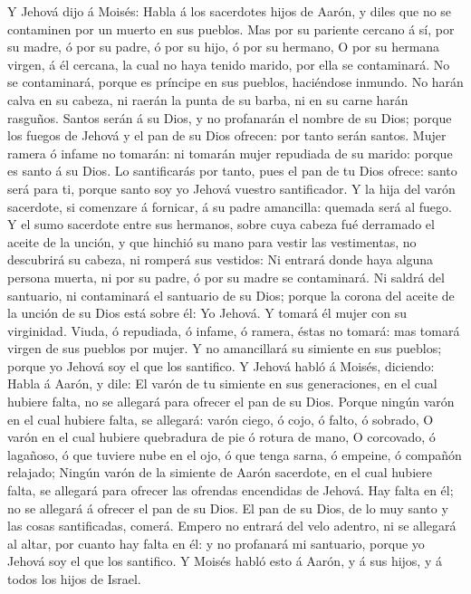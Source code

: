  Y Jehová dijo á Moisés: Habla á los sacerdotes hijos de
Aarón, y diles que no se contaminen por un muerto en sus pueblos.
 Mas por su pariente cercano á sí, por su madre, ó por su
padre, ó por su hijo, ó por su hermano,  O por su hermana
virgen, á él cercana, la cual no haya tenido marido, por ella se
contaminará.  No se contaminará, porque es príncipe en sus
pueblos, haciéndose inmundo.  No harán calva en su cabeza,
ni raerán la punta de su barba, ni en su carne harán rasguños.
 Santos serán á su Dios, y no profanarán el nombre de su
Dios; porque los fuegos de Jehová y el pan de su Dios ofrecen: por tanto
serán santos.  Mujer ramera ó infame no tomarán: ni
tomarán mujer repudiada de su marido: porque es santo á su Dios.
 Lo santificarás por tanto, pues el pan de tu Dios ofrece:
santo será para ti, porque santo soy yo Jehová vuestro santificador.
 Y la hija del varón sacerdote, si comenzare á fornicar, á
su padre amancilla: quemada será al fuego.  Y el sumo
sacerdote entre sus hermanos, sobre cuya cabeza fué derramado el aceite
de la unción, y que hinchió su mano para vestir las vestimentas, no
descubrirá su cabeza, ni romperá sus vestidos:  Ni
entrará donde haya alguna persona muerta, ni por su padre, ó por su
madre se contaminará.  Ni saldrá del santuario, ni
contaminará el santuario de su Dios; porque la corona del aceite de la
unción de su Dios está sobre él: Yo Jehová.  Y tomará él
mujer con su virginidad.  Viuda, ó repudiada, ó infame, ó
ramera, éstas no tomará: mas tomará virgen de sus pueblos por mujer.
 Y no amancillará su simiente en sus pueblos; porque yo
Jehová soy el que los santifico.  Y Jehová habló á
Moisés, diciendo:  Habla á Aarón, y dile: El varón de tu
simiente en sus generaciones, en el cual hubiere falta, no se allegará
para ofrecer el pan de su Dios.  Porque ningún varón en
el cual hubiere falta, se allegará: varón ciego, ó cojo, ó falto, ó
sobrado,  O varón en el cual hubiere quebradura de pie ó
rotura de mano,  O corcovado, ó lagañoso, ó que tuviere
nube en el ojo, ó que tenga sarna, ó empeine, ó compañón relajado;
 Ningún varón de la simiente de Aarón sacerdote, en el
cual hubiere falta, se allegará para ofrecer las ofrendas encendidas de
Jehová. Hay falta en él; no se allegará á ofrecer el pan de su Dios.
 El pan de su Dios, de lo muy santo y las cosas
santificadas, comerá.  Empero no entrará del velo
adentro, ni se allegará al altar, por cuanto hay falta en él: y no
profanará mi santuario, porque yo Jehová soy el que los santifico.
 Y Moisés habló esto á Aarón, y á sus hijos, y á todos
los hijos de Israel.

